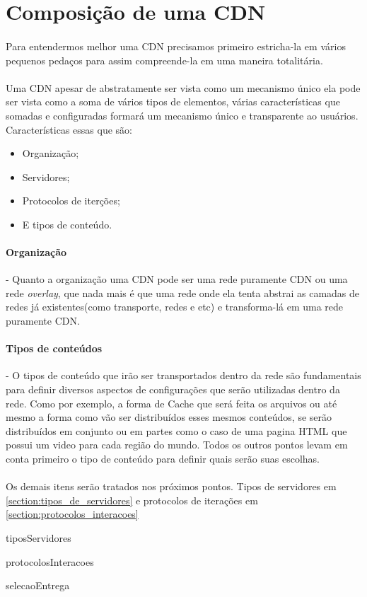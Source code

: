 \section{Composi\c{c}\~ao de uma CDN} \label{sec:composicao}
\paragraph{}
Para entendermos melhor uma CDN precisamos primeiro estricha-la em v\'arios pequenos peda\c{c}os para assim compreende-la em uma maneira totalit\'aria.
\paragraph{}
Uma CDN apesar de abstratamente ser vista como um mecanismo \'unico ela pode ser vista como a soma de v\'arios tipos de elementos, v\'arias caracter\'isticas que somadas e configuradas formar\'a um mecanismo \'unico e transparente ao usu\'arios. Caracter\'isticas essas que s\~ao:
\begin{itemize}
\item Organiza\c{c}\~ao;
\item Servidores;
\item Protocolos de iter\c{c}\~oes;
\item E tipos de conte\'udo.
\end{itemize}

\paragraph{Organiza\c{c}\~ao}- Quanto a organiza\c{c}\~ao uma CDN pode ser uma rede puramente CDN ou uma rede \textit{overlay}, que nada mais \'e que uma rede onde ela tenta abstrai as camadas de redes j\'a existentes(como transporte, redes e etc) e transforma-l\'a em uma rede puramente CDN.

\paragraph{Tipos de conte\'udos}- O tipos de conte\'udo que ir\~ao ser transportados dentro da rede s\~ao fundamentais para definir diversos aspectos de configura\c{c}\~oes que ser\~ao utilizadas dentro da rede. Como por exemplo, a forma de Cache que ser\'a feita os arquivos ou at\'e mesmo a forma como v\~ao ser distribu\'idos esses mesmos conte\'udos, se ser\~ao distribu\'idos em conjunto ou em partes como o caso de uma pagina HTML que possui um video para cada regi\~ao do  mundo. Todos os outros pontos levam em conta primeiro o tipo de conte\'udo para definir quais ser\~ao suas escolhas.
\paragraph{}
Os demais itens ser\~ao tratados nos pr\'oximos pontos. Tipos de servidores em \ref{section:tipos_de_servidores} e protocolos de itera\c{c}\~oes em \ref{section:protocolos_interacoes}

{tiposServidores}

{protocolosInteracoes}

{selecaoEntrega}
